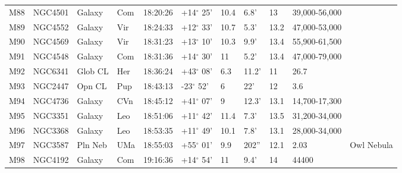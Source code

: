 \documentclass[10pt,twoside,a4paper,english]{article}
\begin{document}
\begin{longtable}{@{}lllllllllll@{}}
M88        & NGC4501     & Galaxy     & Com       & 18:20:26 & +14$^{\circ}$ 25'  & 10.4      & 6.8'                 & 13       & 39,000-56,000       &                                           \\ 
M89        & NGC4552     & Galaxy     & Vir       & 18:24:33 & +12$^{\circ}$ 33'  & 10.7      & 5.3'                 & 13.2     & 47,000-53,000       &                                           \\ 
M90        & NGC4569     & Galaxy     & Vir       & 18:31:23 & +13$^{\circ}$ 10'  & 10.3      & 9.9'                 & 13.4     & 55,900-61,500       &                                           \\ 
M91        & NGC4548     & Galaxy     & Com       & 18:31:36 & +14$^{\circ}$ 30'  & 11        & 5.2'                 & 13.4     & 47,000-79,000       &                                           \\ 
M92        & NGC6341     & Glob CL    & Her       & 18:36:24 & +43$^{\circ}$ 08'  & 6.3       & 11.2'                & 11       & 26.7                &                                           \\ 
M93        & NGC2447     & Opn CL     & Pup       & 18:43:13 & -23$^{\circ}$ 52'  & 6         & 22'                  & 12       & 3.6                 &                                           \\ 
M94        & NGC4736     & Galaxy     & CVn       & 18:45:12 & +41$^{\circ}$ 07'  & 9         & 12.3'                & 13.1     & 14,700-17,300       &                                           \\ 
M95        & NGC3351     & Galaxy     & Leo       & 18:51:06 & +11$^{\circ}$ 42'  & 11.4      & 7.3'                 & 13.5     & 31,200-34,000       &                                           \\ 
M96        & NGC3368     & Galaxy     & Leo       & 18:53:35 & +11$^{\circ}$ 49'  & 10.1      & 7.8'                 & 13.1     & 28,000-34,000       &                                           \\ 
M97        & NGC3587     & Pln Neb    & UMa       & 18:55:03 & +55$^{\circ}$ 01'  & 9.9       & 202''                & 12.1     & 2.03                & Owl Nebula                                \\ 
M98        & NGC4192     & Galaxy     & Com       & 19:16:36 & +14$^{\circ}$ 54'  & 11        & 9.4'                 & 14       & 44400               &                                           \\ 

\end{longtable}
\end{document}
